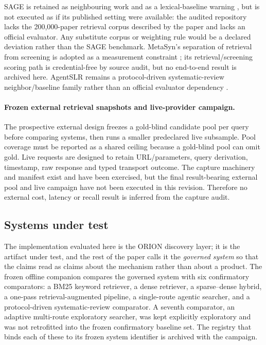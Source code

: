 SAGE is retained as neighbouring work and as a lexical-baseline warning
\cite{sage2026}, but is not executed as if its published setting were available:
the audited repository lacks the 200,000-paper retrieval corpus described by the
paper and lacks an official evaluator.  Any substitute corpus or weighting rule
would be a declared deviation rather than the SAGE benchmark.  MetaSyn's
separation of retrieval from screening is adopted as a measurement constraint
\cite{metasyn2026}; its retrieval/screening scoring path is credential-free by
source audit, but no end-to-end result is archived here.  AgentSLR remains a
protocol-driven systematic-review neighbor/baseline family rather than an
official evaluator dependency \cite{agentslr2026}.

\paragraph{Frozen external retrieval snapshots and live-provider campaign.}
The prospective external design freezes a gold-blind candidate pool per query
before comparing systems, then runs a smaller predeclared live subsample.  Pool
coverage must be reported as a shared ceiling because a gold-blind pool can omit
gold.  Live requests are designed to retain URL/parameters, query derivation,
timestamp, raw response and typed transport outcome.  The capture machinery and
manifest exist and have been exercised, but the final result-bearing external
pool and live campaign have not been executed in this revision.  Therefore no
external cost, latency or recall result is inferred from the capture audit.

\subsection{Systems under test}
The implementation evaluated here is the ORION discovery layer; it is the
artifact under test, and the rest of the paper calls it the \emph{governed
system} so that the claims read as claims about the mechanism rather than about
a product.  The frozen offline companion compares the governed system with six
confirmatory comparators: a BM25 keyword retriever, a dense retriever, a
sparse--dense hybrid, a one-pass retrieval-augmented pipeline, a single-route
agentic searcher, and a protocol-driven systematic-review comparator.  A seventh
comparator, an adaptive multi-route exploratory searcher, was kept explicitly
exploratory and was not retrofitted into the frozen confirmatory baseline set.
The registry that binds each of these to its frozen system identifier is
archived with the campaign.

